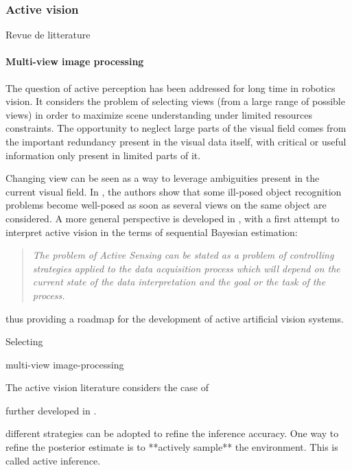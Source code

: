 \documentclass{article}
\begin{document}
 

\subsubsection{Active vision}

{\color{magenta} Revue de litterature}

\paragraph{Multi-view image processing}

The question of active perception has been addressed for long time in robotics vision. It considers the problem of selecting views (from a large range of possible views) in order to maximize scene understanding under limited resources constraints. The opportunity to neglect large parts of the visual field comes from the important redundancy present in the visual data itself, with critical or useful information only present in limited parts of it.

Changing view can be seen as a way to leverage ambiguities present in the current visual field. In \cite{aloimonos1988active}, the authors show that some ill-posed object recognition problems become well-posed as soon as several views on the  same object are considered. 
A more general perspective is developed in \cite{bajcsy1988active}, with a first attempt to interpret active vision in the terms of sequential Bayesian estimation:
\begin{quote}
\emph{The problem  of Active Sensing can be stated as a problem of controlling strategies 
applied to the data acquisition process which will depend on the current state 
of the data interpretation and  the  goal  or the  task of  the  process.}
\end{quote}
thus providing a roadmap for the development of active artificial vision systems.

Selecting 
 
multi-view image-processing

The active vision literature considers the case of 




 further developed in \cite{najemnik2005optimal,butko2010infomax,ahmad2013active,potthast2016active}.



{ different strategies can be adopted to refine the inference accuracy. One way to refine the posterior estimate is to **actively sample** the environment. This is called active inference.} 
	
\end{document}
